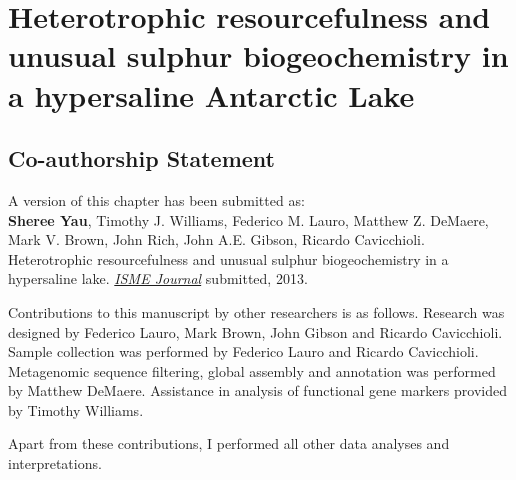 \chapter{Heterotrophic resourcefulness and unusual sulphur biogeochemistry in a hypersaline Antarctic Lake}
\label{ch:org}
\acresetall

\section*{Co-authorship Statement}
A version of this chapter has been submitted as:\\

\textbf{Sheree Yau}, Timothy J. Williams, Federico M. Lauro,  Matthew Z. DeMaere, Mark V. Brown, John Rich, 
John A.E. Gibson, Ricardo Cavicchioli. 
Heterotrophic resourcefulness and unusual sulphur biogeochemistry in a hypersaline lake.
\emph{\underline{ISME Journal}}
submitted, 2013.

Contributions to this manuscript by other researchers is as follows.
Research was designed by Federico Lauro, Mark Brown, John Gibson and Ricardo Cavicchioli.
Sample collection was performed by Federico Lauro and Ricardo Cavicchioli.
Metagenomic sequence filtering, global assembly and annotation was performed by Matthew DeMaere.
Assistance in analysis of functional gene markers provided by Timothy Williams.

Apart from these contributions, I performed all other data analyses and interpretations.
\newpage


